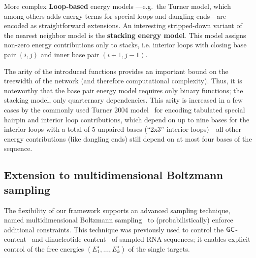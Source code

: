 \documentclass{bioinfo}
\newcommand{\val}{a} %
\newcommand{\Ehp}[1]{E^{\textrm{hp}}(#1)}
\newcommand{\Def}[1]{{\bf #1}}
\newcommand{\TargetE}{E^{\star}}
\newcommand{\Nuc}[1]{{\sf #1}}
\newcommand{\Cb}{\Nuc{C}}
\newcommand{\Gb}{\Nuc{G}}
\begin{document}

More complex \Def{Loop-based}
 energy models ---e.g.~the Turner model,
which among others adds energy terms for special loops and dangling
ends---are encoded as straightforward extensions. An interesting
stripped-down variant of the nearest neighbor model is the
\Def{stacking energy model}. This model assigns non-zero energy
contributions only to stacks, i.e. interior loops with closing base
pair $(i,j)$ and inner base pair $(i+1,j-1)$.

The arity of the introduced functions provides an important bound on the
treewidth of the network (and therefore computational
complexity). Thus, it is noteworthy that the base pair energy model
requires only binary functions; the stacking model, only quarternary
dependencies. This arity is increased in a few cases by the commonly
used Turner 2004 model~\cite{Turner2009} for encoding tabulated
special hairpin and interior loop contributions, which depend on up to
nine bases for the interior loops with a total of 5 unpaired bases
(``2x3'' interior loops)---all other energy contributions (like
dangling ends) still depend on at most four bases of the sequence.

\subsection{Extension to multidimensional Boltzmann sampling}\label{sec:multiBoltzmann}
The flexibility of our framework supports an advanced sampling technique, named multidimensional Boltzmann sampling~\cite{Bodini2010} to (probabilistically) enforce additional constraints.
This technique was previously used to control the $\Gb\Cb$-content~\cite{Waldispuehl2011,Reinharz2013} and dinucleotide content~\cite{Zhang2013} of sampled RNA sequences; it enables explicit control of the free energies $(\TargetE_1,\ldots,\TargetE_k)$ of the single targets. %
\end{document}
